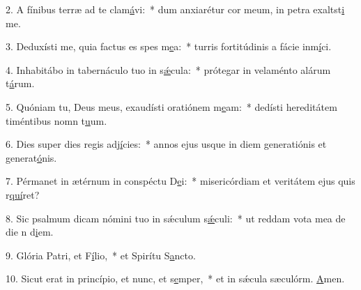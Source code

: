2. A fínibus terræ ad te clam\uline{á}vi:~* dum anxiarétur cor meum, in petra exaltst\uline{i} me.\par 
3. Deduxísti me, quia factus es spes m\uline{e}a:~* turris fortitúdinis a fácie inm\uline{í}ci.\par 
4. Inhabitábo in tabernáculo tuo in s\uline{ǽ}cula:~* prótegar in velaménto alárum t\uline{á}rum.\par 
5. Quóniam tu, Deus meus, exaudísti oratiónem m\uline{e}am:~* dedísti hereditátem timéntibus nomn t\uline{u}um.\par 
6. Dies super dies regis adj\uline{í}cies:~* annos ejus usque in diem generatiónis et generat\uline{ó}nis.\par 
7. Pérmanet in ætérnum in conspéctu D\uline{e}i:~* misericórdiam et veritátem ejus quis r\uline{quí}ret?\par 
8. Sic psalmum dicam nómini tuo in sǽculum s\uline{ǽ}culi:~* ut reddam vota mea de die n d\uline{i}em.\par 
9. Glória Patri, et F\uline{í}lio,~* et Spirítu S\uline{a}ncto.\par 
10. Sicut erat in princípio, et nunc, et s\uline{e}mper,~* et in sǽcula sæculórm. \uline{A}men.\par 
